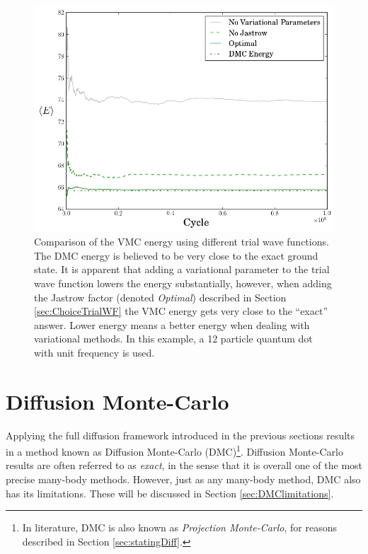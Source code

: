 \begin{figure}
 \begin{center}
  \includegraphics[scale=0.65]{../Graphics/WFComp.png}
  \caption{Comparison of the VMC energy using different trial wave functions. The DMC energy is believed to be very close to the exact ground state. It is apparent that adding a variational parameter to the trial wave function lowers the energy substantially, however, when adding the Jastrow factor (denoted \textit{Optimal}) described in Section \ref{sec:ChoiceTrialWF} the VMC energy gets very close to the ``exact'' answer. Lower energy means a better energy when dealing with variational methods. In this example, a 12 particle quantum dot with unit frequency is used.}
  \label{fig:VMC_wfcomp}
 \end{center}
\end{figure}

\section{Diffusion Monte-Carlo}
\label{sec:DMC}

Applying the full diffusion framework introduced in the previous sections results in a method known as Diffusion Monte-Carlo (DMC)\footnote{In literature, DMC is also known as \textit{Projection Monte-Carlo}, for reasons described in Section \ref{sec:statingDiff}.}. Diffusion Monte-Carlo results are often referred to as \textit{exact}, in the sense that it is overall one of the most precise many-body methods. However, just as any many-body method, DMC also has its limitations. These will be discussed in Section \ref{sec:DMClimitations}.

